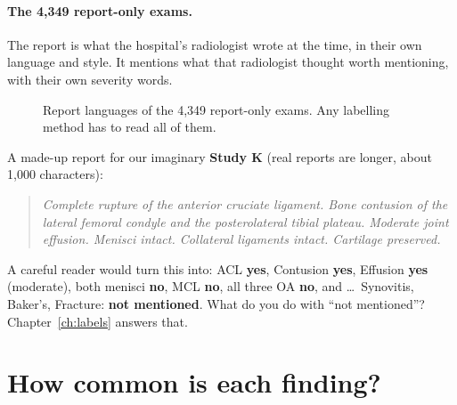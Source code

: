 \paragraph{The 4,349 report-only exams.} The report is what the hospital's radiologist wrote at the time,
in their own language and style. It mentions what that radiologist thought worth mentioning, with their own
severity words.

\begin{figure}[H]
\centering
{}
\caption{Report languages of the 4,349 report-only exams. Any labelling method has to read all of them.}
\label{fig:languages}
\end{figure}

\begin{example}
A made-up report for our imaginary \textbf{Study K} (real reports are longer, about 1,000 characters):
\begin{quote}\small\itshape
Complete rupture of the anterior cruciate ligament. Bone contusion of the lateral femoral condyle and the
posterolateral tibial plateau. Moderate joint effusion. Menisci intact. Collateral ligaments intact.
Cartilage preserved.
\end{quote}
A careful reader would turn this into: ACL \textbf{yes}, Contusion \textbf{yes}, Effusion \textbf{yes}
(moderate), both menisci \textbf{no}, MCL \textbf{no}, all three OA \textbf{no}, and \ldots\ Synovitis, Baker's,
Fracture: \textbf{not mentioned}. What do you do with ``not mentioned''? Chapter~\ref{ch:labels} answers that.
\end{example}

\section{How common is each finding?}

